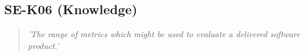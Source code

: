 \subsection{SE-K06 (Knowledge)}

  \begin{quote}
    \textit{'The range of metrics which might be used to
    evaluate a delivered software product.'}
  \end{quote}

\newpage